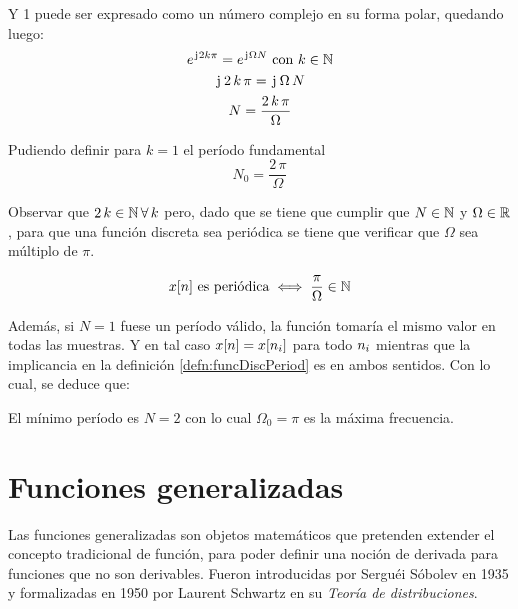 Y 1 puede ser expresado como un número complejo en su forma polar, quedando luego:
\begin{gather*}
    e^{\mkern2mu\mathrm{j}\mkern1mu 2 k \pi} = e^{\mkern2mu\mathrm{j}\mkern1mu \Omega N} \text{ con $k \in \mathbb{N}$}
    \\
    \mkern2mu\mathrm{j}\mkern1mu \, 2 \, k \, \pi = \mkern2mu\mathrm{j}\mkern1mu \, \Omega \, N
    \\
    N = \frac{2 \, k \, \pi}{\Omega}
\end{gather*}

Pudiendo definir para $k=1$ el período fundamental
\begin{equation*}
    N_0 = \frac{2 \, \pi}{\Omega}
\end{equation*}

Observar que $2 \, k \in \mathbb{N} \, \forall \, k$ pero, dado que se tiene que cumplir que $N \in \mathbb{N}$ y $\Omega \in \mathbb{R}$, para que una función discreta sea periódica se tiene que verificar que $\Omega$ sea múltiplo de $\pi$.

\begin{mdframed}[style=PropertyFrame]
    \begin{prop}
    \end{prop}
    \begin{equation*}
        x[n] \text{ es periódica} \iff \frac{\pi}{\Omega} \in \mathbb{N}
    \end{equation*}
\end{mdframed}

Además, si $N=1$ fuese un período válido, la función tomaría el mismo valor en todas las muestras.
Y en tal caso $x[n] = x[n_i]$ para todo $n_i$ mientras que la implicancia en la definición \ref{defn:funcDiscPeriod} es en ambos sentidos.
Con lo cual, se deduce que:

\begin{mdframed}[style=PropertyFrame]
    \begin{prop}
    \end{prop}
    El mínimo período es $N=2$ con lo cual $\Omega_0 = \pi$ es la máxima frecuencia.
\end{mdframed}

\section{Funciones generalizadas}

Las funciones generalizadas son objetos matemáticos que pretenden extender el concepto tradicional de función, para poder definir una noción de derivada para funciones que no son derivables.
Fueron introducidas por Serguéi Sóbolev en 1935 y formalizadas en 1950 por Laurent Schwartz en su \emph{Teoría de distribuciones}.

